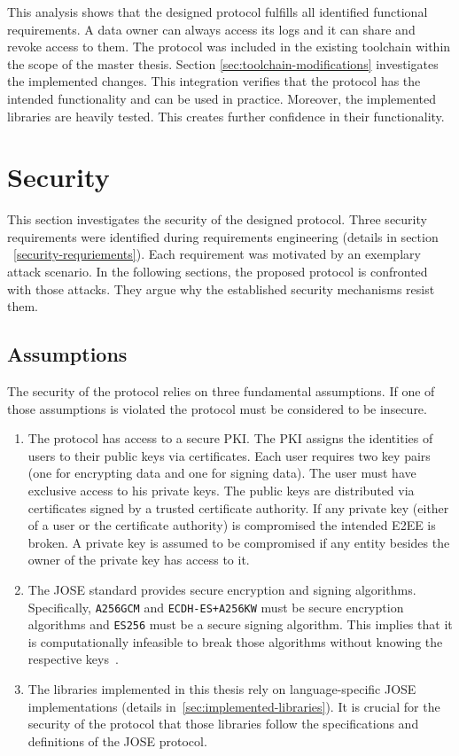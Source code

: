 \documentclass[../main.tex]{subfiles}
\begin{document}
This analysis shows that the designed protocol fulfills all identified functional requirements.
A data owner can always access its logs and it can share and revoke access to them.
The protocol was included in the existing toolchain within the scope of the master thesis.
Section \ref{sec:toolchain-modifications} investigates the implemented changes.
This integration verifies that the protocol has the intended functionality and can be used in practice.
Moreover, the implemented libraries are heavily tested.
This creates further confidence in their functionality.

\section{Security}
\label{sec:evaluation-sec}

This section investigates the security of the designed protocol.
Three security requirements were identified during requirements engineering (details in section ~\ref{security-requriements}).
Each requirement was motivated by an exemplary attack scenario.
In the following sections, the proposed protocol is confronted with those attacks.
They argue why the established security mechanisms resist them.

\subsection{Assumptions}

The security of the protocol relies on three fundamental assumptions.
If one of those assumptions is violated the protocol must be considered to be insecure.

\begin{enumerate}
    \item 
    The protocol has access to a secure PKI.
    The PKI assigns the identities of users to their public keys via certificates.
    Each user requires two key pairs (one for encrypting data and one for signing data).
    The user must have exclusive access to his private keys.
    The public keys are distributed via certificates signed by a trusted certificate authority.
    If any private key (either of a user or the certificate authority) is compromised the intended E2EE is broken.
    A private key is assumed to be compromised if any entity besides the owner of the private key has access to it.
    
    \item 
    The JOSE standard provides secure encryption and signing algorithms.
    Specifically, \verb|A256GCM| and \verb|ECDH-ES+A256KW| must be secure encryption algorithms and \verb|ES256| must be a secure signing algorithm.
    This implies that it is computationally infeasible to break those algorithms without knowing the respective keys~\cite{Katz2020}.
    \item 
    The libraries implemented in this thesis rely on language-specific JOSE implementations (details in~\ref{sec:implemented-libraries}).
    It is crucial for the security of the protocol that those libraries follow the specifications and definitions of the JOSE protocol.
\end{enumerate}
\end{document}
